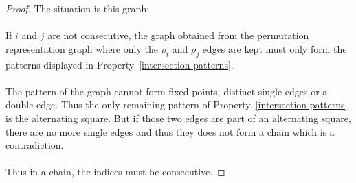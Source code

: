 \begin{proof}
  The situation is this graph:

  \begin{figure}[H]
    \begin{center}
      \caption{}
    \end{center}
  \end{figure}

  \paragraph{}
  If $i$ and $j$ are not consecutive, the graph obtained from the permutation representation graph where only the $\rho_i$ and $\rho_j$ edges are kept must only form the patterns displayed in Property~\ref{intersection-patterns}.

  \paragraph{}
  The pattern of the graph cannot form fixed points, distinct single edges or a double edge. Thus the only remaining pattern of Property~\ref{intersection-patterns} is the alternating square. But if those two edges are part of an alternating square, there are no more single edges and thus they does not form a chain which is a contradiction.

  \paragraph{}
  Thus in a chain, the indices must be consecutive.
\end{proof}

